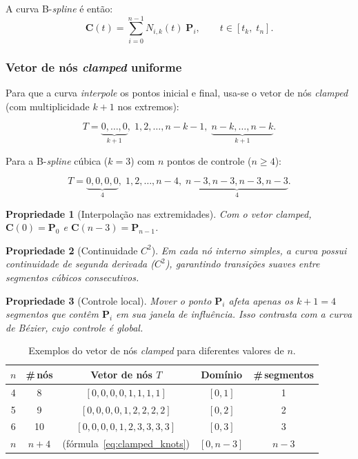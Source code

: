\documentclass[12pt, a4paper]{article}
\newtheorem{prop}{Propriedade}[section]
\theoremstyle{remark}
\begin{document}
A curva B-\emph{spline} é então:
\begin{equation}
    \mathbf{C}(t) = \sum_{i=0}^{n-1} N_{i,k}(t)\;\mathbf{P}_i,
    \qquad t \in [t_k,\; t_n].
    \label{eq:bspline}
\end{equation}

\subsubsection{Vetor de nós \emph{clamped} uniforme}

Para que a curva \emph{interpole} os pontos inicial e final, usa-se o
vetor de nós \emph{clamped} (com multiplicidade $k+1$ nos extremos):

\begin{equation}
    T = \underbrace{0, \ldots, 0}_{k+1},\;
        1, 2, \ldots, n-k-1,\;
        \underbrace{n-k, \ldots, n-k}_{k+1}.
    \label{eq:clamped_knots}
\end{equation}

Para a B-\emph{spline} cúbica ($k = 3$) com $n$ pontos de controle ($n \geq 4$):

\begin{equation}
    T = \underbrace{0, 0, 0, 0}_{4},\;
        1, 2, \ldots, n-4,\;
        \underbrace{n-3, n-3, n-3, n-3}_{4}.
\end{equation}

\begin{prop}[Interpolação nas extremidades]
Com o vetor \emph{clamped}, $\mathbf{C}(0) = \mathbf{P}_0$ e
$\mathbf{C}(n-3) = \mathbf{P}_{n-1}$.
\end{prop}

\begin{prop}[Continuidade $C^2$]
Em cada nó interno simples, a curva possui continuidade de segunda derivada
($C^2$), garantindo transições suaves entre segmentos cúbicos consecutivos.
\end{prop}

\begin{prop}[Controle local]
Mover o ponto $\mathbf{P}_i$ afeta apenas os $k+1 = 4$ segmentos que
contêm $\mathbf{P}_i$ em sua janela de influência. Isso contrasta com a
curva de Bézier, cujo controle é \emph{global}.
\end{prop}

\begin{table}[H]
\centering
\begin{tabular}{ccccc}
\toprule
$n$ & \#\,nós & Vetor de nós $T$ & Domínio & \#\,segmentos \\
\midrule
4 & 8 & $[0,0,0,0,1,1,1,1]$ & $[0,1]$ & 1 \\
5 & 9 & $[0,0,0,0,1,2,2,2,2]$ & $[0,2]$ & 2 \\
6 & 10 & $[0,0,0,0,1,2,3,3,3,3]$ & $[0,3]$ & 3 \\
$n$ & $n+4$ & (fórmula~\ref{eq:clamped_knots}) & $[0, n-3]$ & $n-3$ \\
\bottomrule
\end{tabular}
\caption{Exemplos do vetor de nós \emph{clamped} para diferentes valores de $n$.}
\end{table}
\end{document}
